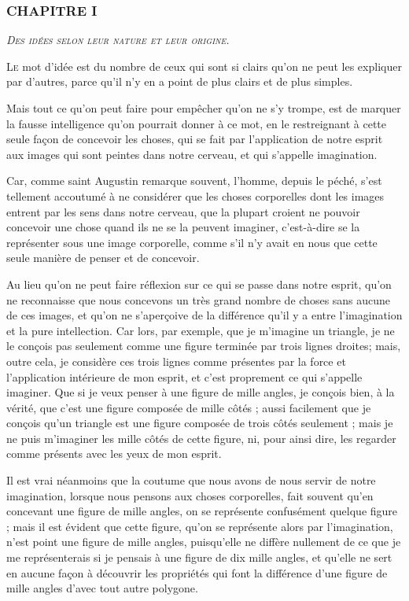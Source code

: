 \subsubsection{\centering \Large CHAPITRE I}
\begin{center}\emph{\large\scshape Des idées selon leur nature et leur origine.}\end{center}

	\lettrine{L}{e} mot d'idée est du nombre de ceux qui sont si clairs qu'on ne peut les expliquer par d'autres, parce qu'il n'y en a point de plus clairs et de plus simples.

Mais tout ce qu'on peut faire pour empêcher qu'on ne s'y trompe, est de marquer la fausse intelligence qu'on pourrait donner à ce mot, en le restreignant à cette seule façon de concevoir les choses, qui se fait par l'application de notre esprit aux images qui sont peintes dans notre cerveau, et qui s'appelle imagination.

Car, comme saint Augustin remarque souvent, l'homme, depuis le péché, s'est tellement accoutumé à ne considérer que les choses corporelles dont les images entrent par les sens dans notre cerveau, que la plupart croient ne pouvoir concevoir une chose quand ils ne se la peuvent imaginer, c'est-à-dire se la représenter sous une image corporelle, comme s'il n'y avait en nous que cette seule manière de penser et de concevoir.

Au lieu qu'on ne peut faire réflexion sur ce qui se passe dans notre esprit, qu'on ne reconnaisse que nous concevons un très grand nombre de choses sans aucune de ces images, et qu'on ne s'aperçoive de la différence qu'il y a entre l'imagination et la pure intellection. Car lors, par exemple, que je m'imagine un triangle, je ne le conçois pas seulement comme une figure terminée par trois lignes droites; mais, outre cela, je considère ces trois lignes comme présentes par la force et l'application intérieure de mon esprit, et c'est proprement ce qui s'appelle imaginer. Que si je veux penser à une figure de mille angles, je conçois bien, à la vérité, que c'est une figure composée de mille côtés ; aussi facilement que je conçois qu'un triangle est une figure composée de trois côtés seulement ; mais je ne puis m'imaginer les mille côtés de cette figure, ni, pour ainsi dire, les regarder comme présents avec les yeux de mon esprit.

Il est vrai néanmoins que la coutume que nous avons de nous servir de notre imagination, lorsque nous pensons aux choses corporelles, fait souvent qu'en concevant une figure de mille angles, on se représente confusément quelque figure ; mais il est évident que cette figure, qu'on se représente alors par l'imagination, n'est point une figure de mille angles, puisqu'elle ne diffère nullement de ce que je me représenterais si je pensais à une figure de dix mille angles, et qu'elle ne sert en aucune façon à découvrir les propriétés qui font la différence d'une figure de mille angles d'avec tout autre polygone.

